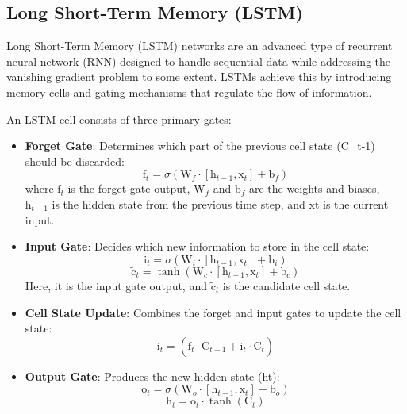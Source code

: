 \documentclass{article}
\begin{document}
\subsection{Long Short-Term Memory (LSTM)}
Long Short-Term Memory (LSTM) networks are an advanced type of recurrent
neural network (RNN) designed to handle sequential data while addressing the
vanishing gradient problem to some extent. LSTMs achieve this by introducing
memory cells and gating mechanisms that regulate the flow of information.

An LSTM cell consists of three primary gates:
\begin{itemize}
    \item \textbf{Forget Gate}: Determines which part of the previous cell state (C\_{t-1})
    should be discarded:
    \begin{equation} \label{eqn4}
        \text{f}_t = {\sigma}(\text{W}_f\cdot[\text{h}_{t-1},\text{x}_t] + \text{b}_f)
    \end{equation}
    where \(\text{f}_t\) is the forget gate output, \(\text{W}_f\) and \(\text{b}_f\) are the weights and biases, \(\text{h}_{t-1}\) is the hidden state from the previous time step, and xt is the current input.
    \item \textbf{Input Gate}: Decides which new information to store in the cell state:
    \begin{equation} \label{eqn5}
        \text{i}_t = {\sigma}(\text{W}_i\cdot[\text{h}_{t-1},\text{x}_t] + \text{b}_i)
    \end{equation}
    \begin{equation} \label{eqn6}
        \tilde{\text{c}}_t = {\tanh}(\text{W}_c\cdot[\text{h}_{t-1},\text{x}_t] + \text{b}_c)
    \end{equation}
    Here, it is the input gate output, and $\tilde{\text{c}}_t$ is the candidate cell state.
    \item \textbf{Cell State Update}: Combines the forget and input gates to update the
    cell state:
    \begin{equation} \label{eqn7}
        \text{i}_t = (\text{f}_t \cdot \text{C}_{t-1} + \text{i}_t \cdot \tilde{\text{C}}_t)
    \end{equation}
    \item \textbf{Output Gate}: Produces the new hidden state (ht):
    \begin{equation} \label{eqn8}
        \text{o}_t = {\sigma}(\text{W}_o\cdot[\text{h}_{t-1},\text{x}_t] + \text{b}_o)
    \end{equation}
    \begin{equation} \label{eqn9}
        \text{h}_t = \text{o}_t\cdot \tanh(\text{C}_t)
    \end{equation}
\end{itemize}
\end{document}
